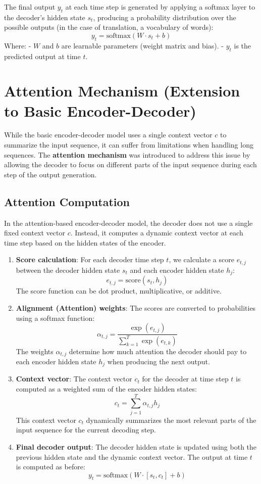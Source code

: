 \documentclass[10pt]{article}
\begin{document}
The final output \( y_t \) at each time step is generated by applying a softmax layer to the decoder’s hidden state \( s_t \), producing a probability distribution over the possible outputs (in the case of translation, a vocabulary of words):
\[
y_t = \text{softmax}(W \cdot s_t + b)
\]
Where:
- \( W \) and \( b \) are learnable parameters (weight matrix and bias).
- \( y_t \) is the predicted output at time \( t \).

\section{ Attention Mechanism (Extension to Basic Encoder-Decoder)}

While the basic encoder-decoder model uses a single context vector \( c \) to summarize the input sequence, it can suffer from limitations when handling long sequences. The {\bf attention mechanism} was introduced to address this issue by allowing the decoder to focus on different parts of the input sequence during each step of the output generation.

\subsection{ Attention Computation}
In the attention-based encoder-decoder model, the decoder does not use a single fixed context vector \( c \). Instead, it computes a dynamic context vector at each time step based on the hidden states of the encoder.

\begin{enumerate}
   \item {\bf Score calculation}: For each decoder time step \( t \), we calculate a score \( e_{t,j} \) between the decoder hidden state \( s_t \) and each encoder hidden state \( h_j \):
      \[
      e_{t,j} = \text{score}(s_t, h_j)
      \]
      The score function can be dot product, multiplicative, or additive.
   
   \item {\bf Alignment (Attention) weights}: The scores are converted to probabilities using a softmax function:
      \[
      \alpha_{t,j} = \frac{\exp(e_{t,j})}{\sum_{k=1}^{T} \exp(e_{t,k})}
      \]
      The weights \( \alpha_{t,j} \) determine how much attention the decoder should pay to each encoder hidden state \( h_j \) when producing the next output.
   
   \item {\bf Context vector}: The context vector \( c_t \) for the decoder at time step \( t \) is computed as a weighted sum of the encoder hidden states:
      \[
      c_t = \sum_{j=1}^{T} \alpha_{t,j} h_j
      \]
      This context vector \( c_t \) dynamically summarizes the most relevant parts of the input sequence for the current decoding step.
   
   \item {\bf Final decoder output}: The decoder hidden state is updated using both the previous hidden state and the dynamic context vector. The output at time \( t \) is computed as before:
      \[
      y_t = \text{softmax}(W \cdot [s_t, c_t] + b)
      \]
\end{enumerate}
\end{document}
